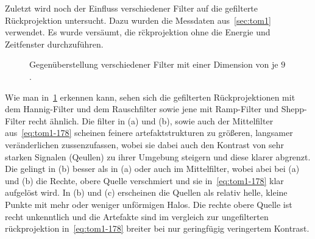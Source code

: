 \documentclass[slug=PET, room=Andreas-Schubert-Bau\,\ 424A, supervisor=Carsten\ Bittrich, coursedate=10.\ 01.\ 2020]{../../Lab_Report_LaTeX/lab_report}
\begin{document}
Zuletzt wird noch der Einfluss verschiedener Filter auf die gefilterte Rückprojektion
untersucht. Dazu wurden die Messdaten aus~\ref{sec:tom1} verwendet. Es
wurde vers\"aumt, die r\"ckprojektion ohne die Energie und Zeitfenster
durchzuf\"uhren.

\begin{figure}[h]
  \centering
  \caption{Gegenüberstellung verschiedener Filter mit einer Dimension
    von je \(9\).}
  \label{fig:filter}
\end{figure}

Wie man in~\ref{fig:filter} erkennen kann, sehen sich die gefilterten
Rückprojektionen mit dem Hannig-Filter und dem Rauschfilter sowie jene
mit Ramp-Filter und Shepp-Filter recht ähnlich. Die filter in (a) und
(b), sowie auch der Mittelfilter aus~\ref{eq:tom1-178} scheinen
feinere artefaktstrukturen zu gr\"o\ss{}eren, langsamer
ver\"anderlichen zussenzufassen, wobei sie dabei auch den Kontrast von
sehr starken Signalen (Qeullen) zu ihrer Umgebung steigern und diese
klarer abgrenzt. Die gelingt in (b) besser als in (a) oder auch im
Mittelfilter, wobei abei bei (a) und (b) die Rechte, obere Quelle
verschmiert und sie in~\ref{eq:tom1-178} klar aufgel\"ost wird. In (b)
und (c) erscheinen die Quellen als relativ helle, kleine Punkte mit
mehr oder weniger unf\"ormigen Halos. Die rechte obere Quelle ist
recht unkenntlich und die Artefakte sind im vergleich zur
ungefilterten r\"uckprojektion in~\ref{eq:tom1-178} breiter bei nur
geringf\"ugig
veringertem Kontrast. \\
\end{document}
